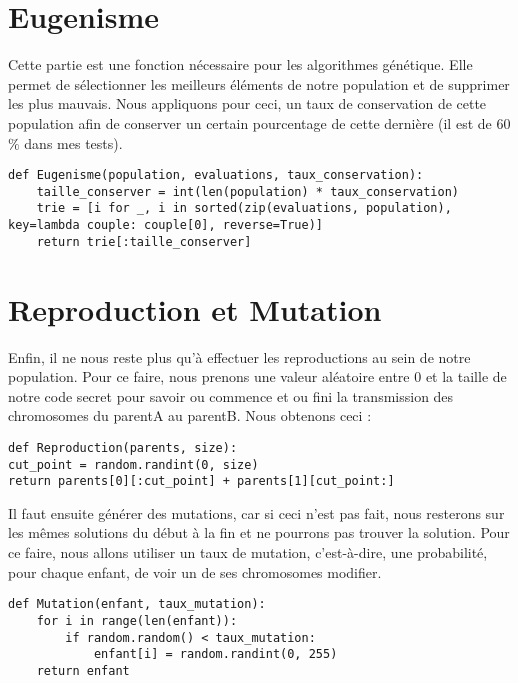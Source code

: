 \documentclass[french,12pt,a4paper]{report}
\begin{document}
\section{Eugenisme}
\label{eugenisme}
Cette partie est une fonction nécessaire pour les algorithmes génétique. Elle permet de sélectionner les meilleurs éléments de notre population et de supprimer les plus mauvais. Nous appliquons pour ceci, un taux de conservation de cette population afin de conserver un certain pourcentage de cette dernière (il est de 60$\%$ dans mes tests).

\begin{lstlisting}[style = python]
def Eugenisme(population, evaluations, taux_conservation):
    taille_conserver = int(len(population) * taux_conservation)
    trie = [i for _, i in sorted(zip(evaluations, population), key=lambda couple: couple[0], reverse=True)]
    return trie[:taille_conserver]
\end{lstlisting}
\vspace{0.2cm}

\section{Reproduction et Mutation}
\label{mutation}
Enfin, il ne nous reste plus qu'à effectuer les reproductions au sein de notre population. Pour ce faire, nous prenons une valeur aléatoire entre 0 et la taille de notre code secret pour savoir ou commence et ou fini la transmission des chromosomes du parentA au parentB. Nous obtenons ceci :
\begin{lstlisting}[style = python]
def Reproduction(parents, size):
cut_point = random.randint(0, size)
return parents[0][:cut_point] + parents[1][cut_point:]
\end{lstlisting}
\vspace{0.2cm}
Il faut ensuite générer des mutations, car si ceci n'est pas fait, nous resterons sur les mêmes solutions du début à la fin et ne pourrons pas trouver la solution. Pour ce faire, nous allons utiliser un taux de mutation, c'est-à-dire, une probabilité, pour chaque enfant, de voir un de ses chromosomes modifier.


\begin{lstlisting}[style = python]
def Mutation(enfant, taux_mutation):
    for i in range(len(enfant)):
        if random.random() < taux_mutation:
            enfant[i] = random.randint(0, 255)
    return enfant
\end{lstlisting}
\end{document}
